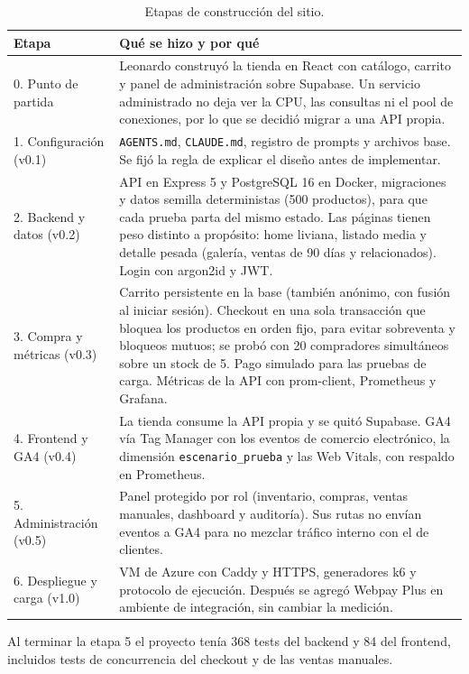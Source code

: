 \documentclass[11pt,a4paper]{article}
\newcommand{\codigo}[1]{\texttt{#1}}
\begin{document}
\begin{table}[H]
\centering\small
\begin{tabularx}{\textwidth}{@{}lX@{}}
\toprule
Etapa & Qué se hizo y por qué \\
\midrule
0. Punto de partida &
  Leonardo construyó la tienda en React con catálogo, carrito y panel de
  administración sobre Supabase. Un servicio administrado no deja ver la CPU,
  las consultas ni el pool de conexiones, por lo que se decidió migrar a una API
  propia. \\
1. Configuración (v0.1) &
  \codigo{AGENTS.md}, \codigo{CLAUDE.md}, registro de prompts y archivos base.
  Se fijó la regla de explicar el diseño antes de implementar. \\
2. Backend y datos (v0.2) &
  API en Express 5 y PostgreSQL 16 en Docker, migraciones y datos semilla
  deterministas (500 productos), para que cada prueba parta del mismo estado.
  Las páginas tienen peso distinto a propósito: home liviana, listado media y
  detalle pesada (galería, ventas de 90 días y relacionados). Login con argon2id
  y JWT. \\
3. Compra y métricas (v0.3) &
  Carrito persistente en la base (también anónimo, con fusión al iniciar
  sesión). Checkout en una sola transacción que bloquea los productos en orden
  fijo, para evitar sobreventa y bloqueos mutuos; se probó con 20 compradores
  simultáneos sobre un stock de 5. Pago simulado para las pruebas de carga.
  Métricas de la API con prom-client, Prometheus y Grafana. \\
4. Frontend y GA4 (v0.4) &
  La tienda consume la API propia y se quitó Supabase. GA4 vía Tag Manager con
  los eventos de comercio electrónico, la dimensión \codigo{escenario\_prueba} y
  las Web Vitals, con respaldo en Prometheus. \\
5. Administración (v0.5) &
  Panel protegido por rol (inventario, compras, ventas manuales, dashboard y
  auditoría). Sus rutas no envían eventos a GA4 para no mezclar tráfico interno
  con el de clientes. \\
6. Despliegue y carga (v1.0) &
  VM de Azure con Caddy y HTTPS, generadores k6 y protocolo de ejecución.
  Después se agregó Webpay Plus en ambiente de integración, sin cambiar la
  medición. \\
\bottomrule
\end{tabularx}
\caption{Etapas de construcción del sitio.}
\end{table}

Al terminar la etapa 5 el proyecto tenía 368 tests del backend y 84 del
frontend, incluidos tests de concurrencia del checkout y de las ventas
manuales.
\end{document}

